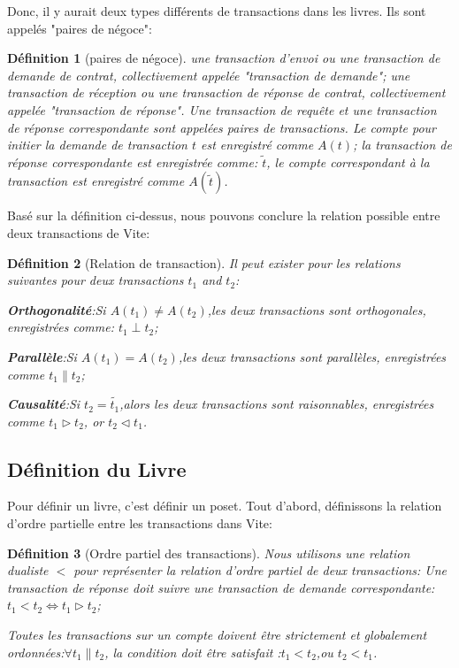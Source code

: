 \documentclass[UTF8,nofonts]{article}
\newtheorem{definition}{Définition}[section]
\begin{document}
\begin{multicols}{2}
Donc, il y aurait deux types différents de transactions dans les livres. Ils sont appelés "paires de négoce":
\begin{definition}[paires de négoce]
une transaction d'envoi ou une transaction de demande de contrat, collectivement appelée "transaction de demande"; une transaction de réception ou une transaction de réponse de contrat, collectivement appelée "transaction de réponse". Une transaction de requête et une transaction de réponse correspondante sont appelées paires de transactions. Le compte pour initier la demande de transaction $t$  est enregistré comme $A(t)$; la transaction de réponse correspondante est enregistrée comme: $\widetilde{t}$, le compte correspondant à la transaction est enregistré comme  $A(\widetilde{t})$.
\end{definition}

Basé sur la définition ci-dessus, nous pouvons conclure la relation possible entre deux transactions de Vite:
\begin{definition}[Relation de transaction]
Il peut exister pour les relations suivantes pour deux transactions $t_{1}$ and $t_{2}$:

\textbf{Orthogonalité}:Si $A(t_{1}) \neq A(t_{2})$,les deux transactions sont orthogonales, enregistrées  comme: $t_{1} \perp t_{2}$;

\textbf{Parallèle}:Si $A(t_{1}) = A(t_{2})$,les deux transactions sont parallèles, enregistrées comme $t_{1} \parallel t_{2}$;

\textbf{Causalité}:Si $t_{2} = \widetilde{t_{1}}$,alors les deux transactions sont raisonnables, enregistrées comme $t_{1} \rhd t_{2}$, or $t_{2} \lhd t_{1}$.
\end{definition}

\subsection{Définition du Livre}
Pour définir un livre, c'est définir un poset. Tout d'abord, définissons la relation d'ordre partielle entre les transactions dans Vite:
\begin{definition}[Ordre partiel des transactions]
Nous utilisons une relation dualiste $<$ pour représenter la relation d'ordre partiel de deux transactions:
Une transaction de réponse doit suivre une transaction de demande correspondante:$t_{1} < t_{2} \Leftrightarrow t_{1} \rhd t_{2}$;

Toutes les transactions sur un compte doivent être strictement et globalement ordonnées:$\forall t_{1} \parallel t_{2}$, la condition doit être satisfait :$t_{1} < t_{2}$,ou $t_{2} < t_{1}$.
\end{definition}


\end{multicols}
\end{document}
